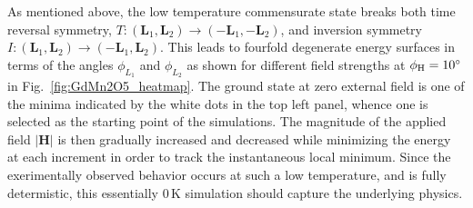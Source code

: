 As mentioned above, the low temperature commensurate state breaks both time reversal symmetry, $T: (\bm{L}_1, \bm{L}_2) \rightarrow (-\bm{L}_1, -\bm{L}_2)$, and inversion symmetry $I:(\bm{L}_1, \bm{L}_2) \rightarrow (-\bm{L}_1, \bm{L}_2)$.
This leads to fourfold degenerate energy surfaces in terms of the angles $\phi_{L_1}$ and $\phi_{L_2}$ as shown for different field strengths at $\phi_{\rm H} = 10^\circ$ in Fig.~\ref{fig:GdMn2O5_heatmap}.
The ground state at zero external field is one of the minima indicated by the white dots in the top left panel, whence one is selected as the starting point of the simulations.
The magnitude of the applied field $|\bm{H}|$ is then gradually increased and decreased while minimizing the energy at each increment in order to track the instantaneous local minimum.
Since the exerimentally observed behavior occurs at such a low temperature, and is fully determistic, this essentially 0\,K simulation should capture the underlying physics.

\begin{figure*}[h]
	\begin{subfigure}{0.24\textwidth}
	\end{subfigure}
	\begin{subfigure}{0.24\textwidth}
	\end{subfigure}
	\begin{subfigure}{0.24\textwidth}
	\end{subfigure}
	\begin{subfigure}{0.24\textwidth}
	\end{subfigure}\\
	\begin{subfigure}{0.24\textwidth}
	\end{subfigure}
	\begin{subfigure}{0.24\textwidth}
	\end{subfigure}
	\begin{subfigure}{0.24\textwidth}
	\end{subfigure}
	\begin{subfigure}{0.24\textwidth}
	\end{subfigure}
	\caption{{\bf Energy Surfaces.} The evolution of the energy surface during field sweep at +10$^\circ$ is displayed, with the white dots in the top left panel denoting the four degenerate minima. If the field would be applied along -10$^\circ$, horizontal gutters would form.\label{fig:GdMn2O5_heatmap}}
\end{figure*}


